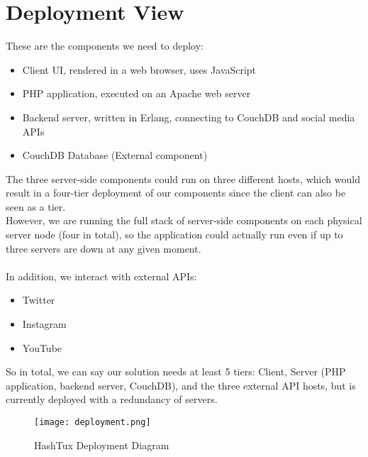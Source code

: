 \chapter{Deployment View}
These are the components we need to deploy:
\begin{itemize}
  \item Client UI, rendered in a web browser, uses JavaScript
  \item PHP application, executed on an Apache web server
  \item Backend server, written in Erlang, connecting to CouchDB and social
     media APIs
  \item CouchDB Database (External component)
\end{itemize}
The three server-side components could run on three different hosts, which would
result in a four-tier deployment of our components since the client can also be
seen as a tier. \\

However, we are running the full stack of server-side components on each
physical server node (four in total), so the application could actually run even
if up to three servers are down at any given moment. \\ \\
In addition, we interact with external APIs:
\begin{itemize}
  \item Twitter
  \item Instagram
  \item YouTube
\end{itemize}
So in total, we can say our solution needs at least 5 tiers: Client, Server
(PHP application, backend server, CouchDB), and the three external API hosts,
but is currently deployed with a redundancy of servers.
\newpage
\begin{figure}[ht]
  \centering
  \texttt{[image: deployment.png]}
  \caption{HashTux Deployment Diagram}
\end{figure}